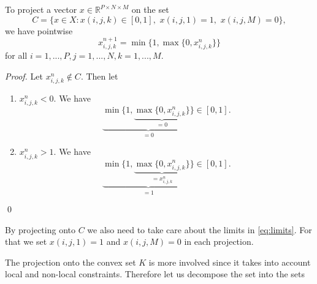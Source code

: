                 \begin{algorithm}[Clipping]
                    To project a vector $x \in \mathbb{R}^{P \times N \times M}$ on the set
                        \begin{equation}
                            C = \{ x \in X: x(i,j,k) \in [0,1], \,\, x(i, j, 1) = 1, \,\, x(i, j, M) = 0 \}, \label{eq:limits}
                        \end{equation}
                    we have pointwise
                        \begin{equation}
                            x^{n+1}_{i,j,k} = \min\{1, \max \{ 0, x^{n}_{i, j, k} \} \}
                        \end{equation}
                    for all $i = 1, ..., P, j = 1, ..., N, k = 1, ..., M$.
                \end{algorithm}

            \begin{proof}
                Let $x^{n}_{i, j, k} \notin C$. Then let
                \begin{enumerate}
                    \item $x^{n}_{i,j,k} < 0$. We have
                    $$
                        \underbrace{\min\{1, \underbrace{\max \{ 0, x^{n}_{i, j, k} \}}_{= 0} \}}_{= 0} \in [0, 1].
                    $$
                    \item $x^{n}_{i,j,k} > 1$. We have
                    $$
                        \underbrace{\min\{1, \underbrace{\max \{ 0, x^{n}_{i, j, k} \}}_{= x^{n}_{i, j, k}} \}}_{= 1} \in [0, 1].
                    $$
                \end{enumerate}
                \qed
            \end{proof}

                \begin{remark}
                    By projecting onto $C$ we also need to take care about the limits in \ref{eq:limits}. For that we set $x(i, j, 1) = 1$ and $x(i, j, M) = 0$ in each projection.
                \end{remark}

            The projection onto the convex set $K$ is more involved since it takes into account local and non-local constraints. Therefore let us decompose the set into the sets

